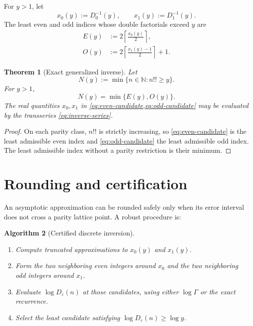 \documentclass[11pt,a4paper,oneside]{book}
\newtheorem{theorem}{Theorem}[chapter]
\newtheorem{algorithm}[theorem]{Algorithm}
\newcommand{\N}{\mathbb N}
\newcommand{\eps}{\varepsilon}
\begin{document}
For \(y>1\), let
\[
 x_0(y):=D_0^{-1}(y),
 \qquad
 x_1(y):=D_1^{-1}(y).
\]
The least even and odd indices whose double factorials exceed \(y\) are
\begin{align}
 E(y)&:=2\left\lceil\frac{x_0(y)}{2}\right\rceil,
 \label{eq:even-candidate}\\
 O(y)&:=2\left\lceil\frac{x_1(y)-1}{2}\right\rceil+1.
 \label{eq:odd-candidate}
\end{align}

\begin{theorem}[Exact generalized inverse]\label{thm:discrete-inverse}
Let
\[
 N(y):=\min\{n\in\N:n!!\ge y\}.
\]
For \(y>1\),
\begin{equation}\label{eq:N-exact}
 \boxed{N(y)=\min\{E(y),O(y)\}.}
\end{equation}
The real quantities \(x_0,x_1\) in \cref{eq:even-candidate,eq:odd-candidate}
may be evaluated by the transseries \cref{eq:inverse-series}.
\end{theorem}

\begin{proof}
On each parity class, \(n!!\) is strictly increasing, so
\cref{eq:even-candidate} is the least admissible even index and
\cref{eq:odd-candidate} the least admissible odd index.  The least admissible
index without a parity restriction is their minimum.
\end{proof}

\section{Rounding and certification}

An asymptotic approximation can be rounded safely only when its error interval
does not cross a parity lattice point.  A robust procedure is:

\begin{algorithm}[Certified discrete inversion]
\begin{enumerate}[label=\arabic*.]
\item Compute truncated approximations to \(x_0(y)\) and \(x_1(y)\).
\item Form the two neighboring even integers around \(x_0\) and the two
      neighboring odd integers around \(x_1\).
\item Evaluate \(\log D_\eps(n)\) at those candidates, using either
      \(\log\Gamma\) or the exact recurrence.
\item Select the least candidate satisfying \(\log D_\eps(n)\ge\log y\).
\end{enumerate}
\end{algorithm}
\end{document}

